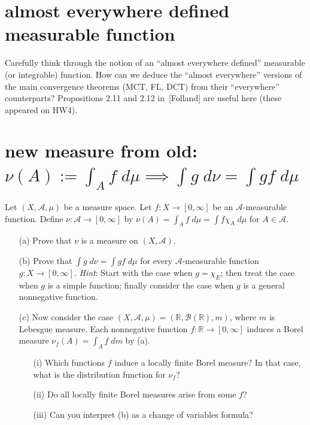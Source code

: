 \documentclass[lang=cn,11pt]{elegantbook}
\begin{document}
\section{almost everywhere defined measurable function}
  Carefully think through the notion of an ``almost everywhere defined'' measurable (or integrable) function.
  How can we deduce the ``almost everywhere'' versions of the main convergence theorems (MCT, FL, DCT) from their ``everywhere'' counterparts?
  Propositions 2.11 and 2.12 in~[Folland] are useful here (these appeared on HW4).
  
\section{new measure from old: $\nu(A):=\int_A f\; d\mu \implies\int g \; d \nu= \int gf \; d\mu$}
  Let $(X, \mathcal{A},\mu)$ be a measure space. Let $f\colon X\to[0,\infty]$ be an $ \mathcal{A}$-measurable function.
Define $\nu\colon  \mathcal{A}\to[0,\infty]$ by  $\nu(A)=\int_A f\; d\mu= \int f\chi_A\; d\mu$ for $A\in \mathcal{A}$.  
\begin{itemize}
\item[(a)]Prove that $\nu$ is a measure on $(X, \mathcal{A})$. 
\item[(b)]Prove that $\int g \; d \nu= \int gf \; d\mu$ for every $ \mathcal{A}$-measurable function $g\colon X\to [0, \infty]$. 
\textit{Hint}: Start with the case when $g=\chi_E$; then treat the case when $g$ is a simple function; finally consider the case when $g$ is a general nonnegative function.
\item[(c)]Now  consider the case $(X, \mathcal{A},\mu)=(\mathbb{R},\mathcal{B}(\mathbb{R}), m)$, where $m$ is Lebesgue measure. 
Each nonnegative function $f\colon \mathbb{R} \to[0,\infty]$ induces a Borel measure $\nu_f(A)= \int_A f \; d m$ by (a).
\begin{itemize}
\item[(i)]Which functions $f$ induce a locally finite Borel measure? In that case, what is the distribution function for $\nu_f$?
\item[(ii)] Do all locally finite Borel measures arise from some $f$?
\item[(iii)] Can you interpret (b) as a change of variables formula? 
\end{itemize}
\end{itemize}
\end{document}
